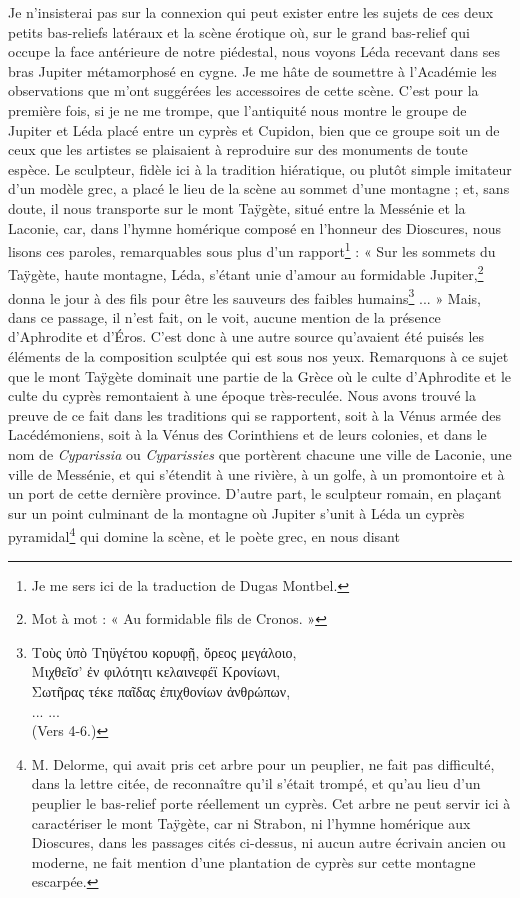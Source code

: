 \documentclass{article}
\begin{document}
Je n'insisterai pas sur la connexion qui peut exister entre les sujets de ces deux petits bas-reliefs latéraux et la scène érotique où, sur le grand bas-relief qui occupe la face antérieure de notre piédestal, nous voyons Léda recevant dans ses bras Jupiter métamorphosé en cygne. Je me hâte de soumettre à l'Académie les observations que m'ont suggérées les accessoires de cette scène. C'est pour la première fois, si je ne me trompe, que l'antiquité nous montre le groupe de Jupiter et Léda placé entre un cyprès et Cupidon, bien que ce groupe soit un de ceux que les artistes se plaisaient à reproduire sur des monuments de toute espèce. Le sculpteur, fidèle ici à la tradition hiératique, ou plutôt simple imitateur d'un modèle grec, a placé le lieu de la scène au sommet d'une montagne ; et, sans doute, il nous transporte sur le mont Taÿgète, situé entre la Messénie et la Laconie, car, dans l'hymne homérique composé en l'honneur des Dioscures, nous lisons ces paroles, remarquables sous plus d'un rapport\footnote{Je me sers ici de la traduction de Dugas Montbel.} : « Sur les sommets du Taÿgète, haute montagne, Léda, s'étant unie d'amour au formidable Jupiter,\footnote{Mot à mot : « Au formidable fils de Cronos. »} donna le jour à des fils pour être les sauveurs des faibles humains\footnote{\textgreek{Τοὺς ὑπὸ Τηϋγέτου κορυφῇ, ὄρεος μεγάλοιο,\\\hspace*{5mm}Μιχθεῖσ' ἐν φιλότητι κελαινεφέϊ Κρονίωνι,\\\hspace*{5mm}Σωτῆρας τέκε παῖδας ἐπιχθονίων ἀνθρώπων},\\\hspace*{5mm}... ...\\\hspace*{10mm}(Vers 4-6.)} ... » Mais, dans ce passage, il n'est fait, on le voit, aucune mention de la présence d'Aphrodite et d'Éros. C'est donc à une autre source qu'avaient été puisés les éléments de la composition sculptée qui est sous nos yeux. Remarquons à ce sujet que le mont Taÿgète dominait une partie de la Grèce où le culte d'Aphrodite et le culte du cyprès remontaient à une époque très-reculée. Nous avons trouvé la preuve de ce fait dans les traditions qui se rapportent, soit à la Vénus armée des Lacédémoniens, soit à la Vénus des Corinthiens et de leurs colonies, et dans le nom de \emph{Cyparissia} ou \emph{Cyparissies} que portèrent chacune une ville de Laconie, une ville de Messénie, et qui s'étendit à une rivière, à un golfe, à un promontoire et à un port de cette dernière province. D'autre part, le sculpteur romain, en plaçant sur un point culminant de la montagne où Jupiter s'unit à Léda un cyprès pyramidal\footnote{M. Delorme, qui avait pris cet arbre pour un peuplier, ne fait pas difficulté, dans la lettre citée, de reconnaître qu'il s'était trompé, et qu'au lieu d'un peuplier le bas-relief porte réellement un cyprès. Cet arbre ne peut servir ici à caractériser le mont Taÿgète, car ni Strabon, ni l'hymne homérique aux Dioscures, dans les passages cités ci-dessus, ni aucun autre écrivain ancien ou moderne, ne fait mention d'une plantation de cyprès sur cette montagne escarpée.} qui domine la scène, et le poète grec, en nous disant 
\end{document}
